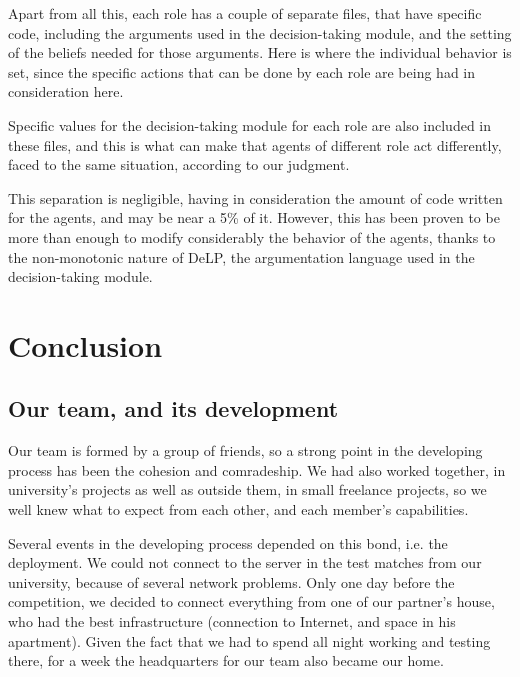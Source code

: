 \documentclass{llncs2e/llncs}
\begin{document}
    Apart from all this, each role has a couple of separate files, that have 
    specific code, including the arguments used in the decision-taking module, and
    the setting of the beliefs needed for those arguments. Here is where the 
    individual behavior is set, since the specific actions that can be done by each
    role are being had in consideration here.
    
    Specific values for the decision-taking module for each role are also included
    in these files, and this is what can make that agents of different role act 
    differently, faced to the same situation, according to our judgment.
    
    This separation is negligible, having in consideration the amount of code 
    written for the agents, and may be near a 5\% of it. However, this has been proven to
    be more than enough to modify considerably the behavior of the agents, thanks to
    the non-monotonic nature of DeLP, the argumentation language used in the 
    decision-taking module.

\section{Conclusion}


\subsection{Our team, and its development}
    
    Our team is formed by a group of friends, so a strong point in the developing 
    process has been the cohesion and comradeship. We had also worked together,
    in university's projects as well as outside them, in small freelance 
    projects, so we well knew what to expect from each other, and each member's 
    capabilities. 

    Several events in the developing process depended on this bond, i.e. the 
    deployment. We could not connect to the server in the test matches from our 
    university, because of several network problems. Only one day before 
    the competition, we decided to connect everything from one of our partner's house, 
    who had the best infrastructure (connection to Internet, and space in his 
    apartment). Given the fact that we had to spend all night working and testing
    there, for a week the headquarters for our team also became our home.
\end{document}
